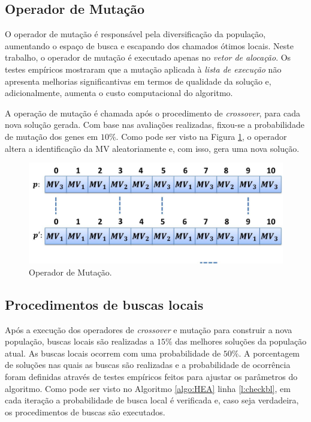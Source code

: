 \subsection{Operador de Mutação} \label{ssec:Mutation}

O operador de mutação é responsável pela diversificação da população, aumentando o espaço de busca e escapando dos chamados ótimos locais. Neste trabalho, o operador de mutação é executado apenas no \textit{vetor de alocação}. Os testes empíricos mostraram que a mutação aplicada à \textit{lista de execução} não apresenta melhorias significantivas em termos de qualidade da solução e, adicionalmente, aumenta o custo computacional do algoritmo.

 
A operação de mutação é chamada após o procedimento de \textit{crossover}, para cada nova solução gerada. Com base nas avaliações realizadas, fixou-se a probabilidade de mutação dos genes em $10\%$. Como pode ser visto na Figura \ref{fig:mutation}, o operador altera a identificação da MV aleatoriamente e, com isso, gera uma nova solução.
 


\begin{figure}[H]
	\center
  \includegraphics[width=0.6\linewidth]{figure/mutation.jpg}
  \caption{Operador de Mutação.}
  \label{fig:mutation}
\end{figure}

\subsection{Procedimentos de buscas locais} \label{ssec:localSearch}

Após a execução dos operadores de \textit{crossover} e mutação para construir a nova população, buscas locais são realizadas a $15\%$ das melhores soluções da população atual. As buscas locais ocorrem com uma probabilidade de $50\%.$ A porcentagem de soluções nas quais as buscas são realizadas e a probabilidade de ocorrência foram definidas através de testes empíricos feitos para ajustar os parâmetros do algoritmo. Como pode ser visto no Algoritmo \ref{algo:HEA} linha \ref{l:checkbl}, em cada iteração a probabilidade de busca local é verificada e, caso seja verdadeira, os procedimentos de buscas são executados.

